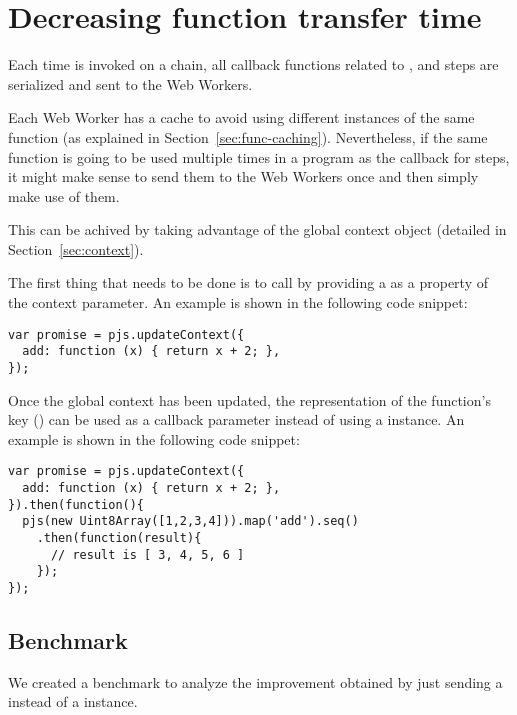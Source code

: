 \section{Decreasing function transfer time}\label{sec:function-transfer-time}

Each time  is invoked on a chain, all callback functions related to ,  and  steps are serialized and sent to the Web Workers.

Each Web Worker has a cache to avoid using different instances of the same function (as explained in Section~\ref{sec:func-caching}). Nevertheless, if the same function is going to be used multiple times in a program as the callback for steps, it might make sense to send them to the Web Workers once and then simply make use of them.

This can be achived by taking advantage of the global context object (detailed in Section~\ref{sec:context}).

The first thing that needs to be done is to call  by providing a \tfunction{} as a property of the context parameter. An example is shown in the following code snippet:
\begin{lstlisting}[caption=Sending function in global context]
var promise = pjs.updateContext({
  add: function (x) { return x + 2; },
});
\end{lstlisting}

Once the global context has been updated, the \tstring{} representation of the function's key () can be used as a callback parameter instead of using a \tfunction{} instance. An example is shown in the following code snippet:
\begin{lstlisting}[caption=Passing a function name from the global context instead of a funciton as a callback]
var promise = pjs.updateContext({
  add: function (x) { return x + 2; },
}).then(function(){
  pjs(new Uint8Array([1,2,3,4])).map('add').seq()
    .then(function(result){
      // result is [ 3, 4, 5, 6 ]
    });
});
\end{lstlisting}

\subsection{Benchmark}
We created a benchmark to analyze the improvement obtained by just sending a \tstring{} instead of a \tfunction{} instance.


